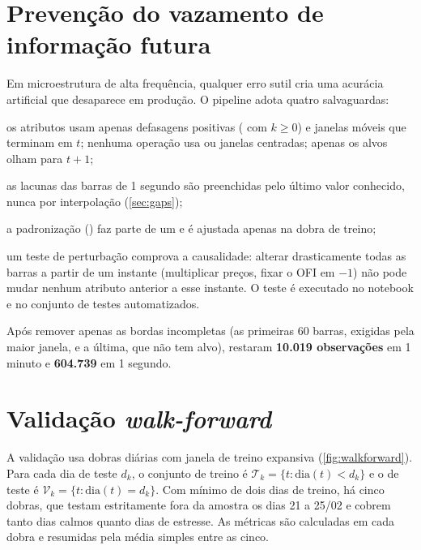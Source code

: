 \section{Prevenção do vazamento de informação futura}\label{sec:vazamento}

Em microestrutura de alta frequência, qualquer erro sutil cria uma acurácia
artificial que desaparece em produção. O pipeline adota quatro salvaguardas:

\begin{alineas}
  \item os atributos usam apenas defasagens positivas ( com
        $k \geq 0$) e janelas móveis que terminam em $t$; nenhuma operação usa
         ou janelas centradas; apenas os alvos olham para
        $t+1$;
  \item as lacunas das barras de 1 segundo são preenchidas pelo último valor
        conhecido, nunca por interpolação (\autoref{sec:gaps});
  \item a padronização () faz parte de um  e
        é ajustada apenas na dobra de treino;
  \item um teste de perturbação comprova a causalidade: alterar drasticamente
        todas as barras a partir de um instante (multiplicar preços, fixar o OFI
        em $-1$) não pode mudar nenhum atributo anterior a esse instante. O
        teste é executado no notebook e no conjunto de testes automatizados.
\end{alineas}

Após remover apenas as bordas incompletas (as primeiras 60 barras, exigidas pela
maior janela, e a última, que não tem alvo), restaram \textbf{10.019
observações} em 1 minuto e \textbf{604.739} em 1 segundo.

\section{Validação \textit{walk-forward}}\label{sec:validacaowf}

A validação usa dobras diárias com janela de treino expansiva
(\autoref{fig:walkforward}). Para cada dia de teste $d_k$, o conjunto de treino é
$\mathcal{T}_k = \{t : \mathrm{dia}(t) < d_k\}$ e o de teste é
$\mathcal{V}_k = \{t : \mathrm{dia}(t) = d_k\}$. Com mínimo de dois dias de
treino, há cinco dobras, que testam estritamente fora da amostra os dias 21 a
25/02 e cobrem tanto dias calmos quanto dias de estresse. As métricas são
calculadas em cada dobra e resumidas pela média simples entre as cinco.

